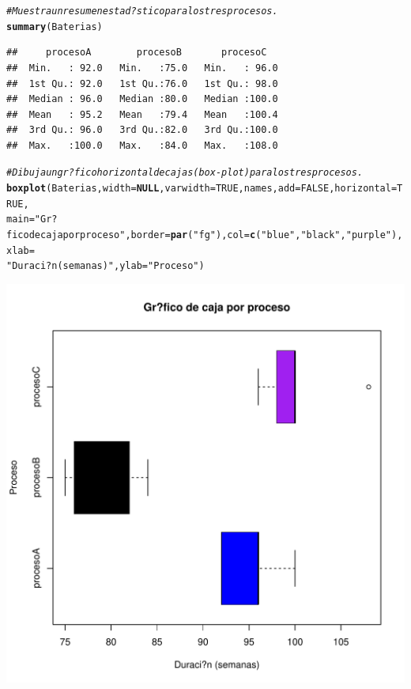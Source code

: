 \documentclass[10pt,a4paper]{article}\usepackage[]{graphicx}\usepackage[]{color}
\makeatletter
\def\maxwidth{ %
  \ifdim\Gin@nat@width>\linewidth
    \linewidth
  \else
    \Gin@nat@width
  \fi
}
\newcommand{\hlnum}[1]{\textcolor[rgb]{0.686,0.059,0.569}{#1}}%
\newcommand{\hlstr}[1]{\textcolor[rgb]{0.192,0.494,0.8}{#1}}%
\newcommand{\hlcom}[1]{\textcolor[rgb]{0.678,0.584,0.686}{\textit{#1}}}%
\newcommand{\hlstd}[1]{\textcolor[rgb]{0.345,0.345,0.345}{#1}}%
\newcommand{\hlkwa}[1]{\textcolor[rgb]{0.161,0.373,0.58}{\textbf{#1}}}%
\newcommand{\hlkwc}[1]{\textcolor[rgb]{0.333,0.667,0.333}{#1}}%
\newcommand{\hlkwd}[1]{\textcolor[rgb]{0.737,0.353,0.396}{\textbf{#1}}}%
\newenvironment{kframe}{%
 \def\at@end@of@kframe{}%
 \ifinner\ifhmode%
  \def\at@end@of@kframe{\end{minipage}}%
  \begin{minipage}{\columnwidth}%
 \fi\fi%
 \def\FrameCommand##1{\hskip\@totalleftmargin \hskip-\fboxsep
 \colorbox{shadecolor}{##1}\hskip-\fboxsep
     \hskip-\linewidth \hskip-\@totalleftmargin \hskip\columnwidth}%
 \MakeFramed {\advance\hsize-\width
   \@totalleftmargin\z@ \linewidth\hsize
   \@setminipage}}%
 {\par\unskip\endMakeFramed%
 \at@end@of@kframe}
\newenvironment{knitrout}{}{} %
\makeatother
\begin{document}
\begin{knitrout}
\begin{kframe}\begin{alltt}
\hlcom{#Muestra un resumen estad?stico para los tres procesos. }
\hlkwd{summary}\hlstd{(Baterias)}
\end{alltt}
\begin{verbatim}
##     procesoA        procesoB       procesoC    
##  Min.   : 92.0   Min.   :75.0   Min.   : 96.0  
##  1st Qu.: 92.0   1st Qu.:76.0   1st Qu.: 98.0  
##  Median : 96.0   Median :80.0   Median :100.0  
##  Mean   : 95.2   Mean   :79.4   Mean   :100.4  
##  3rd Qu.: 96.0   3rd Qu.:82.0   3rd Qu.:100.0  
##  Max.   :100.0   Max.   :84.0   Max.   :108.0
\end{verbatim}
\begin{alltt}
\hlcom{#Dibuja un gr?fico horizontal de cajas (box-plot) para los tres procesos. }
\hlkwd{boxplot}\hlstd{(Baterias,} \hlkwc{width}\hlstd{=}\hlkwa{NULL}\hlstd{,} \hlkwc{varwidth}\hlstd{=}\hlnum{TRUE}\hlstd{,names,} \hlkwc{add}\hlstd{=} \hlnum{FALSE}\hlstd{,} \hlkwc{horizontal} \hlstd{=} \hlnum{TRUE}\hlstd{,}
\hlkwc{main}\hlstd{=}\hlstr{"Gr?fico de caja por proceso"}\hlstd{,} \hlkwc{border}\hlstd{=}\hlkwd{par}\hlstd{(}\hlstr{"fg"}\hlstd{),} \hlkwc{col}\hlstd{=}\hlkwd{c}\hlstd{(}\hlstr{"blue"}\hlstd{,} \hlstr{"black"}\hlstd{,} \hlstr{"purple"}\hlstd{),} \hlkwc{xlab} \hlstd{=}
\hlstr{"Duraci?n (semanas)"}\hlstd{,} \hlkwc{ylab}\hlstd{=}\hlstr{"Proceso"}\hlstd{)}
\end{alltt}
\end{kframe}
\includegraphics[width=\maxwidth]{figure/unnamed-chunk-7-2} 

\end{knitrout}
\end{document}
